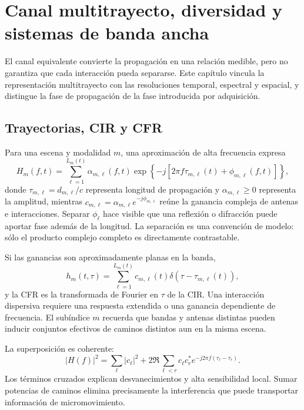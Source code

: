 \chapter{Canal multitrayecto, diversidad y sistemas de banda ancha}
\label{ch:multitrayectoria}

El canal equivalente convierte la propagación en una relación medible, pero no
garantiza que cada interacción pueda separarse. Este capítulo vincula la
representación multitrayecto con las resoluciones temporal, espectral y espacial,
y distingue la fase de propagación de la fase introducida por adquisición.

\section{Trayectorias, CIR y CFR}

Para una escena y modalidad $m$, una aproximación de alta frecuencia expresa
\begin{equation}
H_m(f,t)=\sum_{\ell=1}^{L_m(t)}
\alpha_{m,\ell}(f,t)
\exp\!\left\{-j\left[2\pi f\tau_{m,\ell}(t)+\phi_{m,\ell}(f,t)\right]\right\},
\label{eq:multipath}
\end{equation}
donde $\tau_{m,\ell}=d_{m,\ell}/c$ representa longitud de propagación y
$\alpha_{m,\ell}\geq0$ representa la amplitud, mientras
$c_{m,\ell}=\alpha_{m,\ell}e^{-j\phi_{m,\ell}}$ reúne la ganancia compleja de
antenas e interacciones.
Separar $\phi_\ell$ hace visible que una reflexión o difracción puede aportar fase
además de la longitud. La separación es una convención de modelo: sólo el producto
complejo completo es directamente contrastable.

Si las ganancias son aproximadamente planas en la banda,
\begin{equation}
h_m(t,\tau)=\sum_{\ell=1}^{L_m(t)}
c_{m,\ell}(t)
\delta(\tau-\tau_{m,\ell}(t)),
\end{equation}
y la \ac{CFR} es la transformada de Fourier en $\tau$ de la \ac{CIR}. Una
interacción dispersiva requiere una respuesta extendida o una ganancia dependiente
de frecuencia. El subíndice $m$ recuerda que bandas y antenas distintas pueden
inducir conjuntos efectivos de caminos distintos aun en la misma escena.

La superposición es coherente:
\begin{equation}
|H(f)|^2=\sum_\ell|c_\ell|^2+
2\Re\sum_{\ell<r}c_\ell c_r^*
e^{-j2\pi f(\tau_\ell-\tau_r)}.
\label{eq:coherent_power}
\end{equation}
Los términos cruzados explican desvanecimientos y alta sensibilidad local.
Sumar potencias de caminos elimina precisamente la interferencia que puede
transportar información de micromovimiento.

